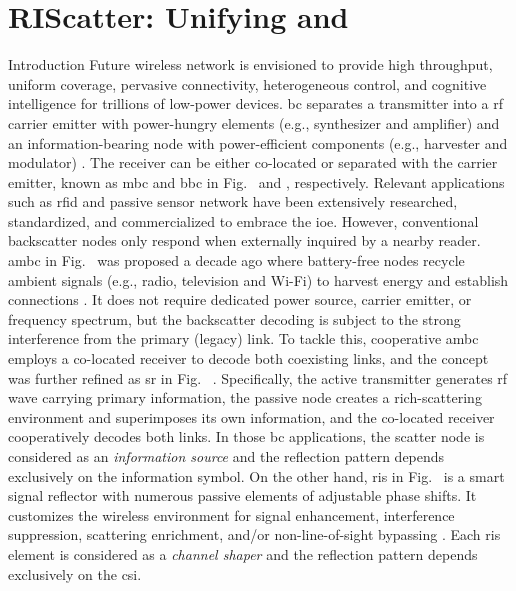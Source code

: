 
\graphicspath{{assets/chapter_4/}}

\chapter{RIScatter: Unifying  and }\label{ch:riscatter}


\begin{section}{Introduction}
	\label{sc:introduction}
	Future wireless network is envisioned to provide high throughput, uniform coverage, pervasive connectivity, heterogeneous control, and cognitive intelligence for trillions of low-power devices.
	\gls{bc} separates a transmitter into a \gls{rf} carrier emitter with power-hungry elements (e.g., synthesizer and amplifier) and an information-bearing node with power-efficient components (e.g., harvester and modulator) \cite{Boyer2014}.
	The receiver can be either co-located or separated with the carrier emitter, known as \gls{mbc} and \gls{bbc} in Fig.~ and , respectively.
	Relevant applications such as \gls{rfid} \cite{Dobkin2012,Landt2005} and passive sensor network \cite{Vannucci2008,Assimonis2016} have been extensively researched, standardized, and commercialized to embrace the \gls{ioe}.
	However, conventional backscatter nodes only respond when externally inquired by a nearby reader.
	\gls{ambc} in Fig.~ was proposed a decade ago where battery-free nodes recycle ambient signals (e.g., radio, television and Wi-Fi) to harvest energy and establish connections \cite{Liu2013b}.
	It does not require dedicated power source, carrier emitter, or frequency spectrum, but the backscatter decoding is subject to the strong interference from the primary (legacy) link.
	To tackle this, cooperative \gls{ambc} \cite{Yang2018} employs a co-located receiver to decode both coexisting links, and the concept was further refined as \gls{sr} in Fig.~ \cite{Liang2020}.
	Specifically, the active transmitter generates \gls{rf} wave carrying primary information, the passive node creates a rich-scattering environment and superimposes its own information, and the co-located receiver cooperatively decodes both links.
	In those \gls{bc} applications, the scatter node is considered as an \emph{information source} and the reflection pattern depends exclusively on the information symbol.
	On the other hand, \gls{ris} in Fig.~ is a smart signal reflector with numerous passive elements of adjustable phase shifts.
	It customizes the wireless environment for signal enhancement, interference suppression, scattering enrichment, and/or non-line-of-sight bypassing \cite{Wu2021b}.
	Each \gls{ris} element is considered as a \emph{channel shaper} and the reflection pattern depends exclusively on the \gls{csi}.


\end{section}
